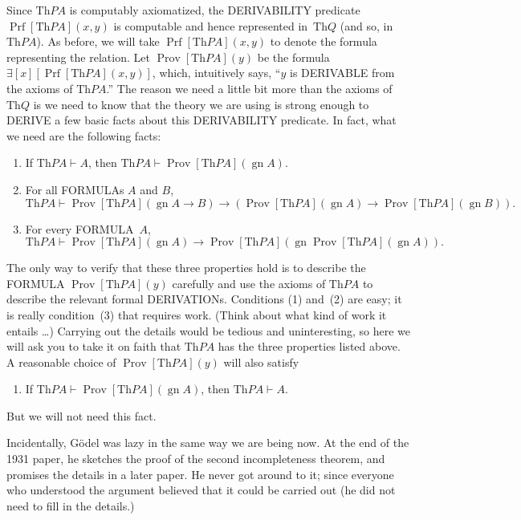 \documentclass[10pt,a4paper]{article}
\newcommand*{\olup}[1]{\MakeUppercase{#1}}
\theoremstyle{plain}
\theoremstyle{definition}
\theoremstyle{remark}
\newenvironment{digress}{}{}
\providecommand{\lif}{\mathbin{\rightarrow}}
\providecommand{\lexists}{\mathord{\exists}}
\providecommand{\Proves}{\mathrel{\vdash}}
\providecommand{\Th}{\ensuremath{\mathrm{Th}}}
\providecommand{\Prf}{\operatorname{Prf}}
\providecommand{\gn}{\operatorname{gn}}
\providecommand{\OProv}{\operatorname{Prov}}
\providecommand{\OPrf}{\operatorname{Prf}}
\begin{document}
Since $\Th{PA}$ is computably axiomatized, the \olup{derivability}
predicate $\Prf[\Th{PA}](x,y)$ is computable and hence represented
in~$\Th{Q}$ (and so, in~$\Th{PA}$). As before, we will take
$\OPrf[\Th{PA}](x,y)$ to denote the formula representing the relation.
Let $\OProv[\Th{PA}](y)$ be the formula
$\lexists[x][\Prf[\Th{PA}](x,y)]$, which, intuitively says, ``$y$ is
\olup{derivable} from the axioms of $\Th{PA}$.''  The reason we need a
little bit more than the axioms of $\Th{Q}$ is we need to know that
the theory we are using is strong enough to \olup{derive} a few basic
facts about this \olup{derivability} predicate. In fact, what we need are
the following facts:
\begin{enumerate}
\item[P1.] If $\Th{PA} \Proves A$, then $\Th{PA} \Proves
  \OProv[\Th{PA}](\gn{A})$.
\item[P2.] For all \olup{formula}s $A$ and $B$,
  \[
  \Th{PA} \Proves \OProv[\Th{PA}](\gn{A \lif B}) \lif
  (\OProv[\Th{PA}](\gn{A}) \lif \OProv[\Th{PA}](\gn{B})).
  \]
\item[P3.] For every \olup{formula}~$A$,
  \[
  \Th{PA} \Proves \OProv[\Th{PA}](\gn{A})
  \lif \OProv[\Th{PA}](\gn{\OProv[\Th{PA}](\gn{A})}).
  \]
\end{enumerate}
The only way to verify that these three properties hold is to describe
the \olup{formula} $\OProv[\Th{PA}](y)$ carefully and use the axioms of
$\Th{PA}$ to describe the relevant formal \olup{derivation}s. Conditions (1)
and~(2) are easy; it is really condition~(3) that requires
work. (Think about what kind of work it entails \dots) Carrying out the
details would be tedious and uninteresting, so here we will ask you to
take it on faith that $\Th{PA}$ has the three properties listed
above. A reasonable choice of $\OProv[\Th{PA}](y)$ will also satisfy
\begin{enumerate}
\item[P4.] If $\Th{PA} \Proves \OProv[\Th{PA}](\gn{A})$, then
  $\Th{PA} \Proves A$.
\end{enumerate}
But we will not need this fact.

\begin{digress}
Incidentally, G\"odel was lazy in the same way we are
being now. At the end of the 1931 paper, he sketches the proof of the
second incompleteness theorem, and promises the details in a later
paper. He never got around to it; since everyone who understood the
argument believed that it could be carried out (he did not need to
fill in the details.)
\end{digress}
\end{document}
